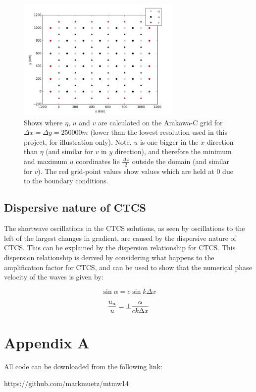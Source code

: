 \documentclass{article}
\begin{document}
\begin{figure}[ht!]
    \centering
    \includegraphics[width=300px]{figures/arakawa_c_grid}
    \caption{Shows where $\eta$, $u$ and $v$ are calculated on the Arakawa-C grid for $\Delta x =
	\Delta y = 250000  m$ (lower than the lowest resolution used in this project, for
	illustration only). Note, $u$ is one bigger in the $x$ direction than $\eta$ (and similar
	for $v$ in $y$ direction), and therefore the minimum and maximum $u$ coordinates lie
	$\frac{\Delta x}{2}$ outside the domain (and similar for $v$). The red grid-point values
	show values which are held at $0$ due to the boundary conditions. }
    \label{fig:arakawa_c_grid}
\end{figure}


\subsection*{Dispersive nature of CTCS}

The shortwave oscillations in the CTCS solutions, as seen by oscillations to the left of the largest
changes in gradient, are caused by the dispersive nature of CTCS. This can be explained by the
dispersion relationship for CTCS. This dispersion relationship is derived by considering what
happens to the amplification factor for CTCS, and can be used to show that the numerical phase
velocity of the waves is given by:

\begin{equation}
    \sin \alpha = c \sin k \Delta x
\end{equation}

\begin{equation}
    \frac{u_n}{u} = \pm \frac{\alpha}{c k \Delta x}\\
\end{equation}


\section*{Appendix A}

All code can be downloaded from the following link:

https://github.com/markmuetz/mtmw14
\end{document}
